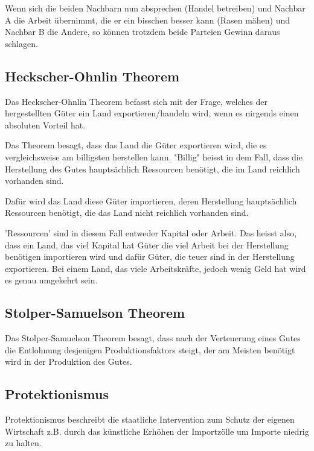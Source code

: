 \documentclass[a4paper, 11pt]{article}
\begin{document}
\noindent Wenn sich die beiden Nachbarn nun absprechen (Handel betreiben) und Nachbar A die Arbeit übernimmt, die er ein bisschen besser kann (Rasen mähen) und Nachbar B die Andere, so können trotzdem beide Parteien Gewinn daraus schlagen.

\vspace{10px}

\subsection{Heckscher-Ohnlin Theorem}

Das Heckscher-Ohnlin Theorem befasst sich mit der Frage, welches der hergestellten Güter ein Land exportieren/handeln wird, wenn es nirgends einen absoluten Vorteil hat. 

Das Theorem besagt, dass das Land die Güter exportieren wird, die es vergleichsweise am billigsten herstellen kann. "Billig" heisst in dem Fall, dass die Herstellung des Gutes hauptsächlich Ressourcen benötigt, die im Land reichlich vorhanden sind. 

Dafür wird das Land diese Güter importieren, deren Herstellung hauptsächlich Ressourcen benötigt, die das Land nicht reichlich vorhanden sind.
\vspace{10px}

\noindent 'Ressourcen' sind in diesem Fall entweder Kapital oder Arbeit. Das heisst also, dass ein Land, das viel Kapital hat Güter die viel Arbeit bei der Herstellung benötigen importieren wird und dafür Güter, die teuer sind in der Herstellung exportieren. Bei einem Land, das viele Arbeitskräfte, jedoch wenig Geld hat wird es genau umgekehrt sein. 

\subsection{Stolper-Samuelson Theorem}
Das Stolper-Samuelson Theorem besagt, dass nach der Verteuerung eines Gutes die Entlohnung desjenigen Produktionsfaktors steigt, der am Meisten benötigt wird in der Produktion des Gutes.

\subsection{Protektionismus}

Protektionismus beschreibt die staatliche Intervention zum Schutz der eigenen Wirtschaft z.B. durch das künstliche Erhöhen der Importzölle um Importe niedrig zu halten.
\end{document}
